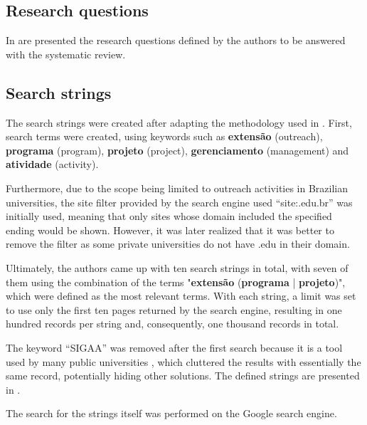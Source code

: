 

\subsection{Research questions}\label{sec:gl-planning-rq}

In  are presented the research questions defined by the authors to be answered with the systematic review.



\subsection{Search strings}\label{sec:gl-planning-strings}

The search strings were created after adapting the methodology used in \cite{godin2015applying}. First, search terms were created, using keywords such as \textbf{extensão} (outreach), \textbf{programa} (program), \textbf{projeto} (project), \textbf{gerenciamento} (management) and \textbf{atividade} (activity).

Furthermore, due to the scope being limited to outreach activities in Brazilian universities, the site filter provided by the search engine used ``site:.edu.br'' was initially used, meaning that only sites whose domain included the specified ending would be shown. However, it was later realized that it was better to remove the filter as some private universities do not have .edu in their domain.

Ultimately, the authors came up with ten search strings in total, with seven of them using the combination of the terms "\textbf{extensão} (\textbf{programa} | \textbf{projeto})", which were defined as the most relevant terms. With each string, a limit was set to use only the first ten pages returned by the search engine, resulting in one hundred records per string and, consequently, one thousand records in total.

The keyword ``\acs{SIGAA}'' was removed after the first search because it is a tool used by many public universities \cite{das2013sistema}, which cluttered the results with essentially the same record, potentially hiding other solutions. The defined strings are presented in .



The search for the strings itself was performed on the Google search engine.

